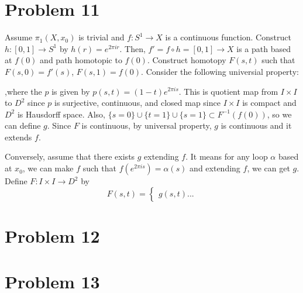 \documentclass{article}
\begin{document}
\section*{Problem 11}
Assume $\pi_1(X, x_0)$ is trivial and $f:S^1\rightarrow X$ is a continuous function. Construct $h:[0,1]\rightarrow S^1$ by $h(r)=e^{2\pi i r}$. Then, $f'=f\circ h=[0,1]\rightarrow X$ is a path based at $f(0)$ and path homotopic to $f(0)$. Construct homotopy $F(s,t)$ such that $F(s, 0)=f'(s)$, $F(s,1)=f(0)$. Consider the following universial property:
\begin{figure}[h]
\centering
{}
\end{figure}
,where the $p$ is given by $p(s,t)=(1-t)e^{2\pi i s}$. This is quotient map from $I\times I$ to $D^2$ since $p$ is surjective, continuous, and closed map since $I\times I$ is compact and $D^2$ is Hausdorff space. Also, $\{s=0\}\cup\{t=1\}\cup \{s=1\}\subset F^{-1}(f(0))$, so we can define $g$. Since $F$ is continuous, by universal property, $g$ is continuous and it extends $f$.

Conversely, assume that there exists $g$ extending $f$. It means for any loop $\alpha$ based at $x_0$, we can make $f$ such that $f(e^{2\pi i s})=\alpha(s)$ and extending $f$, we can get $g$. Define $F:I\times I\rightarrow D^2$ by
\begin{equation*}
F(s,t)=\begin{cases}
g(s,t)...
\end{cases}
\end{equation*}
\section*{Problem 12}
\section*{Problem 13}
\end{document}
